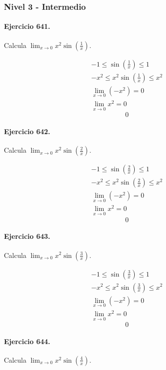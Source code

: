 \documentclass[11pt,a4paper]{article}
\begin{document}
\newpage

\subsubsection*{Nivel 3 - Intermedio}

\paragraph{Ejercicio 641.} Calcula $\displaystyle\lim_{x\to0}x^2\sin\left(\frac{1}{x}\right)$.

\[
\begin{aligned}
-1\le\sin\left(\frac{1}{x}\right)\le1\\
-x^2\le x^2\sin\left(\frac{1}{x}\right)\le x^2\\
\lim_{x\to0}(-x^2)=0\\
\lim_{x\to0}x^2=0
\end{aligned}
\]
\[\boxed{0}\]


\paragraph{Ejercicio 642.} Calcula $\displaystyle\lim_{x\to0}x^2\sin\left(\frac{2}{x}\right)$.

\[
\begin{aligned}
-1\le\sin\left(\frac{2}{x}\right)\le1\\
-x^2\le x^2\sin\left(\frac{2}{x}\right)\le x^2\\
\lim_{x\to0}(-x^2)=0\\
\lim_{x\to0}x^2=0
\end{aligned}
\]
\[\boxed{0}\]


\paragraph{Ejercicio 643.} Calcula $\displaystyle\lim_{x\to0}x^2\sin\left(\frac{3}{x}\right)$.

\[
\begin{aligned}
-1\le\sin\left(\frac{3}{x}\right)\le1\\
-x^2\le x^2\sin\left(\frac{3}{x}\right)\le x^2\\
\lim_{x\to0}(-x^2)=0\\
\lim_{x\to0}x^2=0
\end{aligned}
\]
\[\boxed{0}\]


\paragraph{Ejercicio 644.} Calcula $\displaystyle\lim_{x\to0}x^2\sin\left(\frac{4}{x}\right)$.
\end{document}
